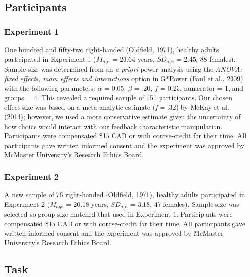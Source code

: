 \documentclass[
  man, donotrepeattitle,floatsintext]{apa7}
\begin{document}
\hypertarget{participants}{%
\subsection{Participants}\label{participants}}

\hypertarget{experiment-1}{%
\subsubsection{Experiment 1}\label{experiment-1}}

One hundred and fifty-two right-handed (Oldfield, 1971), healthy adults participated in Experiment 1 (\(M_{age}\) = 20.64 years, \(SD_{age}\) = 2.45, 88 females). Sample size was determined from an \emph{a-priori} power analysis using the \emph{ANOVA: fixed effects, main effects and interactions} option in G*Power (Faul et al., 2009) with the following parameters: \(\alpha\) = 0.05, \(\beta\) = .20, \(f\) = 0.23, numerator = 1, and groups = \textcolor{blue}{4}. This revealed a required sample of 151 participants. Our chosen effect size was based on a meta-analytic estimate (\emph{f} = .32) by McKay et al. (2014); however, we used a more conservative estimate given the uncertainty of how choice would interact with our feedback characteristic manipulation. Participants were compensated \$15 CAD or with course-credit for their time. All participants gave written informed consent and the experiment was approved by McMaster University's Research Ethics Board.

\hypertarget{experiment-2}{%
\subsubsection{Experiment 2}\label{experiment-2}}

A new sample of 76 right-handed (Oldfield, 1971), healthy adults participated in Experiment 2 (\(M_{age}\) = 20.18 years, \(SD_{age}\) = 3.18, 47 females). Sample size was selected so group size matched that used in Experiment 1. Participants were compensated \$15 CAD or with course-credit for their time. All participants gave written informed consent and the experiment was approved by McMaster University's Research Ethics Board.

\hypertarget{task}{%
\subsection{Task}\label{task}}
\end{document}
